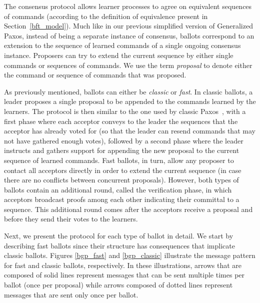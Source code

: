 The consensus protocol allows learner processes to agree on equivalent sequences of commands (according to the definition of equivalence present in Section~\ref{bft_model}). Much like in our previous simplified version of Generalized Paxos, instead of being a separate instance of consensus, ballots correspond to an extension to the sequence of learned commands of a single ongoing consensus instance. Proposers can try to extend the current sequence by either single commands or sequences of commands. We use the term \textit{proposal} to denote either the command or sequence of commands that was proposed.\par
As previously mentioned, ballots can either be \textit{classic} or \textit{fast}. In classic ballots, a leader proposes a single proposal to be appended to the commands learned by the learners. The protocol is then similar to the one used by classic Paxos~\cite{Lamport:1998}, with a first phase where each acceptor conveys to the leader the sequences that the acceptor has already voted for (so that the leader can resend commands that may not have gathered enough votes), followed by a second phase where the leader instructs and gathers support for appending the new proposal to the current sequence of learned commands. Fast ballots, in turn, allow any proposer to contact all acceptors directly in order to extend the current sequence (in case there are no conflicts between concurrent proposals). However, both types of ballots contain an additional round, called the verification phase, in which acceptors broadcast proofs among each other indicating their committal to a sequence. This additional round comes after the acceptors receive a proposal and before they send their votes to the learners.\par
Next, we present the protocol for each type of ballot in detail. We start by describing fast ballots since their structure has consequences that implicate classic ballots. Figures \ref{bgp_fast} and \ref{bgp_classic} illustrate the message pattern for fast and classic ballots, respectively. In these illustrations, arrows that are composed of solid lines represent messages that can be sent multiple times per ballot (once per proposal) while arrows composed of dotted lines represent messages that are sent only once per ballot.

